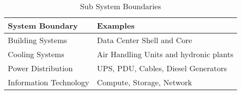 \begin{table}
\centering
\begin{tabular}{|l|l|} \hline
\bf{System Boundary} & \bf{Examples} \\ \hline 
Building Systems & Data Center Shell and Core \\ \hline
Cooling Systems & Air Handling Units and hydronic plants \\ \hline
Power Distribution & UPS, PDU, Cables, Diesel Generators \\ \hline
Information Technology & Compute, Storage, Network \\
\hline\end{tabular}
\caption{Sub System Boundaries}
\label{tab:dc_subsystem_boundaries}
\end{table}